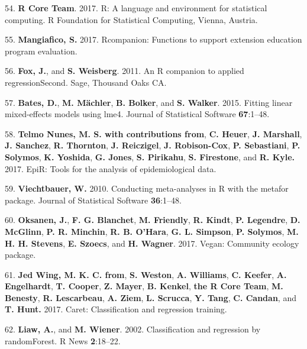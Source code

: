 \documentclass[12pt,]{article}
\begin{document}
\hypertarget{ref-r_citation_2017}{}
54. \textbf{R Core Team}. 2017. R: A language and environment for
statistical computing. R Foundation for Statistical Computing, Vienna,
Austria.

\hypertarget{ref-rcompanion_citation_2017}{}
55. \textbf{Mangiafico, S.} 2017. Rcompanion: Functions to support
extension education program evaluation.

\hypertarget{ref-car_citation_2011}{}
56. \textbf{Fox, J.}, and \textbf{S. Weisberg}. 2011. An R companion to
applied regressionSecond. Sage, Thousand Oaks CA.

\hypertarget{ref-lme4_citation_2015}{}
57. \textbf{Bates, D.}, \textbf{M. Mächler}, \textbf{B. Bolker}, and
\textbf{S. Walker}. 2015. Fitting linear mixed-effects models using
lme4. Journal of Statistical Software \textbf{67}:1--48.

\hypertarget{ref-epir_citation_2017}{}
58. \textbf{Telmo Nunes, M. S. with contributions from}, \textbf{C.
Heuer}, \textbf{J. Marshall}, \textbf{J. Sanchez}, \textbf{R. Thornton},
\textbf{J. Reiczigel}, \textbf{J. Robison-Cox}, \textbf{P. Sebastiani},
\textbf{P. Solymos}, \textbf{K. Yoshida}, \textbf{G. Jones}, \textbf{S.
Pirikahu}, \textbf{S. Firestone}, and \textbf{R. Kyle.} 2017. EpiR:
Tools for the analysis of epidemiological data.

\hypertarget{ref-metafor_citation_2010}{}
59. \textbf{Viechtbauer, W.} 2010. Conducting meta-analyses in R with
the metafor package. Journal of Statistical Software \textbf{36}:1--48.

\hypertarget{ref-vegan_citation_2017}{}
60. \textbf{Oksanen, J.}, \textbf{F. G. Blanchet}, \textbf{M. Friendly},
\textbf{R. Kindt}, \textbf{P. Legendre}, \textbf{D. McGlinn}, \textbf{P.
R. Minchin}, \textbf{R. B. O'Hara}, \textbf{G. L. Simpson}, \textbf{P.
Solymos}, \textbf{M. H. H. Stevens}, \textbf{E. Szoecs}, and \textbf{H.
Wagner}. 2017. Vegan: Community ecology package.

\hypertarget{ref-caret_citation_2017}{}
61. \textbf{Jed Wing, M. K. C. from}, \textbf{S. Weston}, \textbf{A.
Williams}, \textbf{C. Keefer}, \textbf{A. Engelhardt}, \textbf{T.
Cooper}, \textbf{Z. Mayer}, \textbf{B. Kenkel}, \textbf{the R Core
Team}, \textbf{M. Benesty}, \textbf{R. Lescarbeau}, \textbf{A. Ziem},
\textbf{L. Scrucca}, \textbf{Y. Tang}, \textbf{C. Candan}, and
\textbf{T. Hunt.} 2017. Caret: Classification and regression training.

\hypertarget{ref-randomforest_citation_2002}{}
62. \textbf{Liaw, A.}, and \textbf{M. Wiener}. 2002. Classification and
regression by randomForest. R News \textbf{2}:18--22.
\end{document}
